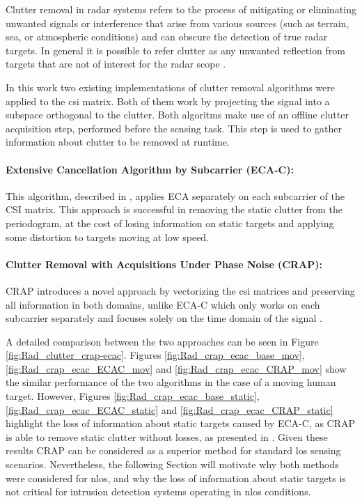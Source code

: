 	Clutter removal in radar systems refers to the process of mitigating or eliminating unwanted signals or interference that arise from various sources (such as terrain, sea, or atmospheric conditions) and can obscure the detection of true radar targets.
	In general it is possible to refer clutter as any unwanted reflection from targets that are not of interest for the radar scope \cite{Richards_Scheer_Holm_2010}.
	
	In this work two existing implementations of clutter removal algorithms were applied to the \gls{csi} matrix.
	Both of them work by projecting the signal into a subspace orthogonal to the clutter.
	Both algoritms make use of an offline clutter acquisition step, performed before the sensing task. This step is used to gather information about clutter to be removed at runtime.
	
	\paragraph{Extensive Cancellation Algorithm by Subcarrier (ECA-C):}
	This algorithm, described in \cite{Wan_Cheng_Gong_Zhao_Shao_2012}, applies ECA \cite{Colone_ECA_2009} separately on each subcarrier of the CSI matrix.
	This approach is successful in removing the static clutter from the periodogram, at the cost of losing information on static targets and applying some distortion to targets moving at low speed.
	\paragraph{Clutter Removal with Acquisitions Under Phase Noise (CRAP):}
	CRAP introduces a novel approach by vectorizing the \gls{csi} matrices and preserving all information in both domains, unlike ECA-C which only works on each subcarrier separately and focuses solely on the time domain of the signal \cite{Henninger_CRAP_2023}.
	
	A detailed comparison between the two approaches can be seen in Figure \ref{fig:Rad_clutter_crap-ecac}. 
	Figures \ref{fig:Rad_crap_ecac_base_mov}, \ref{fig:Rad_crap_ecac_ECAC_mov} and \ref{fig:Rad_crap_ecac_CRAP_mov} show the similar performance of the two algorithms in the case of a moving human target. However, Figures \ref{fig:Rad_crap_ecac_base_static}, \ref{fig:Rad_crap_ecac_ECAC_static} and \ref{fig:Rad_crap_ecac_CRAP_static} highlight the loss of information about static targets caused by ECA-C, as CRAP is able to remove static clutter without losses, as presented in \cite{Henninger_CRAP_2023}.
	Given these results CRAP can be considered as a superior method for standard \gls{los} sensing scenarios.
	Nevertheless, the following Section will motivate why both methods were considered for \gls{nlos}, and why the loss of information about static targets is not critical for intrusion detection systems operating in \gls{nlos} conditions.
	
